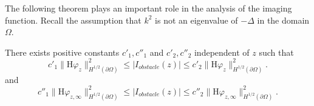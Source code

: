 \documentclass[final]{siamltex}
\begin{document}
The following theorem plays an important role in the analysis of the imaging function. Recall the assumption that $k^2$ is not an eigenvalue of $-\Delta$ in the domain  $\Omega$.
\begin{theorem} \label{obstacle Iz theorem}
There exists positive constants $c'_1, c''_1$ and $c'_2, c''_2$ independent of $z$ such that
\begin{equation}
c'_1 \|  \mathrm{H} \varphi_z\|^2_{H^{1/2}(\partial \Omega)}\le \big| I_{obstacle}(z)\big| \le c'_2  \|  \mathrm{H} \varphi_z\|^2_{H^{1/2}(\partial \Omega)}.
\end{equation}
and
\begin{equation}
c''_1 \|  \mathrm{H} \varphi_{z,\infty}\|^2_{H^{1/2}(\partial \Omega)}\le \big| I_{obstacle}(z)\big| \le c''_2  \|  \mathrm{H} \varphi_{z,\infty}\|^2_{H^{1/2}(\partial \Omega)}.
\end{equation}
\end{theorem}
\end{document}
